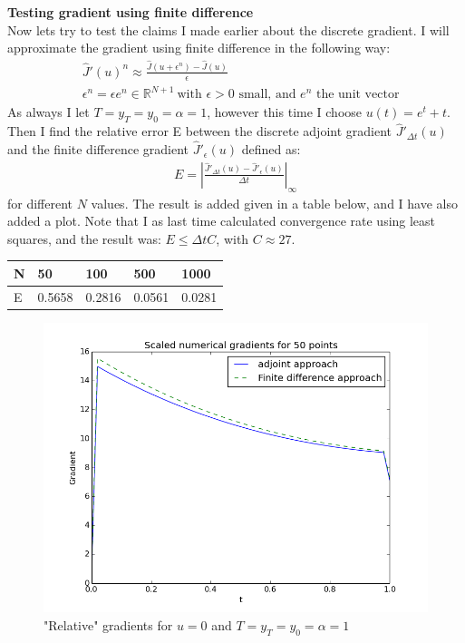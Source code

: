 \documentclass[11pt,a4paper]{report}
\begin{document}
\\
\\
\textbf{Testing gradient using finite difference}
\\
Now lets try to test the claims I made earlier about the discrete gradient. I will approximate the gradient using finite difference in the following way:
\begin{align*}
&\hat{J}'(u)^n \approx \frac{\hat{J}(u+\epsilon^n)-\hat{J}(u)}{\epsilon} \\
&\epsilon^n=\epsilon e^n \in \mathbb{R}^{N+1} \ \text{with $\epsilon>0$ small, and $e^n$ the unit vector}
\end{align*} 
As always I let $T=y_T=y_0=\alpha=1$, however this time I choose $u(t)=e^t+t$. Then I find the relative error E between the discrete adjoint gradient $\hat{J}'_{\Delta t}(u)$ and the finite difference gradient $\hat{J}'_{\epsilon}(u)$ defined as:
\begin{align*}
E=|\frac{\hat{J}'_{\Delta t}(u)-\hat{J}'_{\epsilon}(u)}{\Delta t}|_{\infty}
\end{align*}
for different $N$ values. The result is added given in a table below, and I have also added a plot. Note that I as last time calculated convergence rate using least squares, and the result was: $E\leq \Delta tC$, with $C\approx27$.
\begin{center}
    \begin{tabular}{| l | l | l | l | l |}
    \hline
    N & 50 & 100  & 500 & 1000 \\ \hline
    E & 0.5658 &0.2816 &0.0561 & 0.0281	\\ \hline
    \end{tabular}
\end{center}
\begin{figure}
  \includegraphics[width=\linewidth]{finite_diff_plot.png}
  \caption{"Relative" gradients for $u=0$ and $T=y_T=y_0=\alpha=1$}
  \label{Fig 2}
\end{figure}
\end{document}
